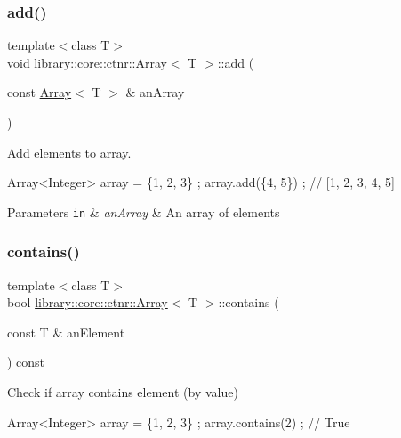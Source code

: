\subsubsection{\texorpdfstring{add()}{add()}\hspace{0.1cm}{\footnotesize\ttfamily [2/2]}}
{\footnotesize\ttfamily template$<$class T$>$ \\
void \hyperlink{classlibrary_1_1core_1_1ctnr_1_1Array}{library\+::core\+::ctnr\+::\+Array}$<$ T $>$\+::add (\begin{DoxyParamCaption}\item[{const \hyperlink{classlibrary_1_1core_1_1ctnr_1_1Array}{Array}$<$ T $>$ \&}]{an\+Array }\end{DoxyParamCaption})}



Add elements to array. 


\begin{DoxyCode}
Array<Integer> array = \{1, 2, 3\} ;
array.add(\{4, 5\}) ; \textcolor{comment}{// [1, 2, 3, 4, 5]}
\end{DoxyCode}



\begin{DoxyParams}[1]{Parameters}
\mbox{\tt in}  & {\em an\+Array} & An array of elements \\
\hline
\end{DoxyParams}
\mbox{\label{classlibrary_1_1core_1_1ctnr_1_1Array_a9c423eb8a34dddc81e0ede9435094e99}} 
\subsubsection{\texorpdfstring{contains()}{contains()}}
{\footnotesize\ttfamily template$<$class T$>$ \\
bool \hyperlink{classlibrary_1_1core_1_1ctnr_1_1Array}{library\+::core\+::ctnr\+::\+Array}$<$ T $>$\+::contains (\begin{DoxyParamCaption}\item[{const T \&}]{an\+Element }\end{DoxyParamCaption}) const}



Check if array contains element (by value) 


\begin{DoxyCode}
Array<Integer> array = \{1, 2, 3\} ;
array.contains(2) ; \textcolor{comment}{// True}
\end{DoxyCode}



